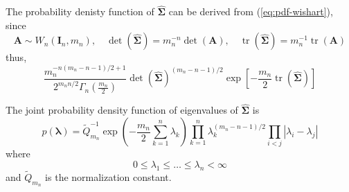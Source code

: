 The probability denisty function of $\widehat{\boldsymbol{\Sigma}}$ can be derived from (\ref{eq:pdf-wishart}), since
\begin{equation*}
    \mathbf{A}\sim W_{n}\left(\mathbf{I}_{n},m_{n}\right),\quad\operatorname{det}\left(\widehat{\boldsymbol{\Sigma}}\right)=m_{n}^{-n}\operatorname{det}\left(\mathbf{A}\right),\quad\operatorname{tr}\left(\widehat{\boldsymbol{\Sigma}}\right)=m_{n}^{-1}\operatorname{tr}\left(\mathbf{A}\right)
\end{equation*}
thus,
\begin{equation}
    \frac{m_{n}^{-n(m_{n}-n-1)/2+1}}{2^{m_{n}n/2}\Gamma_{n}\left(\frac{m_{n}}{2}\right)}\operatorname{det}\left(\widehat{\boldsymbol{\Sigma}}\right)^{(m_{n}-n-1)/2}\exp\left[-\frac{m_{n}}{2}\operatorname{tr}\left(\widehat{\boldsymbol{\Sigma}}\right)\right]
\end{equation}

\begin{theorem}
    The joint probability density function of eigenvalues of $\widehat{\boldsymbol{\Sigma}}$ is
    \begin{equation}
        p\left(\boldsymbol{\lambda}\right)=\widetilde{Q}_{m_{n}}^{-1}\exp\left(-\frac{m_{n}}{2}\sum_{k=1}^{n}\lambda_{k}\right)\prod_{k=1}^{n}\lambda_{k}^{(m_{n}-n-1)/2}\prod_{i<j}\left|\lambda_{i}-\lambda_{j}\right|
        \label{eq:jpdf-eigenvalues-sigma}
    \end{equation}
    where
    \begin{equation*}
        0\leq\lambda_{1}\leq\ldots\leq\lambda_{n}<\infty
    \end{equation*}
    and $\widetilde{Q}_{m_{n}}$ is the normalization constant.
\end{theorem}

